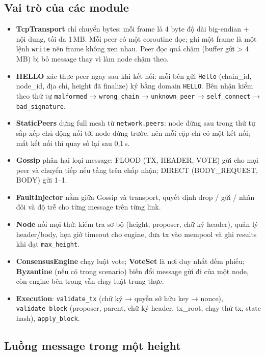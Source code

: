 \documentclass[11pt,a4paper]{article}
\newcommand{\code}[1]{\texttt{#1}}
\begin{document}
\subsection{Vai trò của các module}
\begin{itemize}
\item \textbf{TcpTransport} chỉ chuyển bytes: mỗi frame là 4 byte độ dài big-endian + nội dung, tối đa 1\,MB. Mỗi peer có một coroutine đọc; ghi một frame là một lệnh \code{write} nên frame không xen nhau. Peer đọc quá chậm (buffer gửi > 4\,MB) bị bỏ message thay vì làm node chậm theo.
\item \textbf{HELLO} xác thực peer ngay sau khi kết nối: mỗi bên gửi \code{Hello} (chain\_id, node\_id, địa chỉ, height đã finalize) ký bằng domain \code{HELLO}. Bên nhận kiểm theo thứ tự \code{malformed} → \code{wrong\_chain} → \code{unknown\_peer} → \code{self\_connect} → \code{bad\_signature}.
\item \textbf{StaticPeers} dựng full mesh từ \code{network.peers}: node đứng sau trong thứ tự sắp xếp chủ động nối tới node đứng trước, nên mỗi cặp chỉ có một kết nối; mất kết nối thì quay số lại sau 0,1\,s.
\item \textbf{Gossip} phân hai loại message: FLOOD (TX, HEADER, VOTE) gửi cho mọi peer và chuyển tiếp nếu tầng trên chấp nhận; DIRECT (BODY\_REQUEST, BODY) gửi 1--1.
\item \textbf{FaultInjector} nằm giữa Gossip và transport, quyết định drop / gửi / nhân đôi và độ trễ cho từng message trên từng link.
\item \textbf{Node} nối mọi thứ: kiểm tra sơ bộ (height, proposer, chữ ký header), quản lý header/body, hẹn giờ timeout cho engine, đưa tx vào mempool và ghi results khi đạt \code{max\_height}.
\item \textbf{ConsensusEngine} chạy luật vote; \textbf{VoteSet} là nơi duy nhất đếm phiếu; \textbf{Byzantine} (nếu có trong scenario) biến đổi message gửi đi của một node, còn engine bên trong vẫn chạy luật trung thực.
\item \textbf{Execution}: \code{validate\_tx} (chữ ký → quyền sở hữu key → nonce), \code{validate\_block} (proposer, parent, chữ ký header, tx\_root, chạy thử tx, state hash), \code{apply\_block}.
\end{itemize}

\subsection{Luồng message trong một height}
\end{document}
